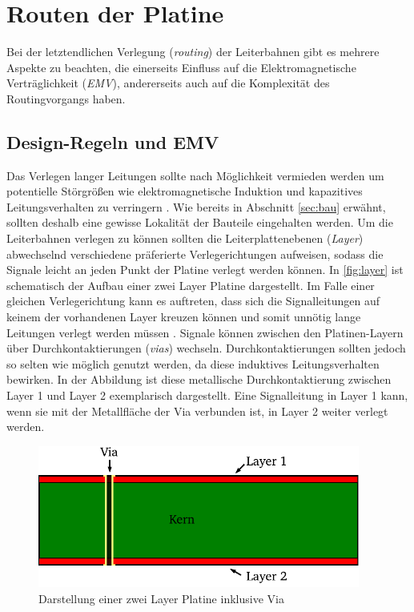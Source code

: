 \section{Routen der Platine}
Bei der letztendlichen Verlegung (\textit{routing}) der Leiterbahnen gibt es mehrere Aspekte zu beachten, die einerseits Einfluss auf die Elektromagnetische Verträglichkeit (\textit{EMV}), andererseits auch auf die Komplexität des Routingvorgangs haben.
\subsection{Design-Regeln und EMV}\label{sec:design}
Das Verlegen langer Leitungen sollte nach Möglichkeit vermieden werden um potentielle Störgrößen wie elektromagnetische Induktion und kapazitives Leitungsverhalten zu verringern \cite{haendschke}. Wie bereits in Abschnitt \autoref{sec:bau} erwähnt, sollten deshalb eine gewisse Lokalität der Bauteile eingehalten werden. Um die Leiterbahnen verlegen zu können sollten die Leiterplattenebenen (\textit{Layer}) abwechselnd verschiedene präferierte Verlegerichtungen aufweisen, sodass die Signale leicht an jeden Punkt der Platine verlegt werden können. In \autoref{fig:layer} ist schematisch der Aufbau einer zwei Layer Platine dargestellt. Im Falle einer gleichen Verlegerichtung kann es auftreten, dass sich die Signalleitungen auf keinem der vorhandenen Layer kreuzen können und somit unnötig lange Leitungen verlegt werden müssen \cite{haendschke}. Signale können zwischen den Platinen-Layern über Durchkontaktierungen (\textit{vias}) wechseln. Durchkontaktierungen sollten jedoch so selten wie möglich genutzt werden, da diese induktives Leitungsverhalten bewirken. In der Abbildung ist diese metallische Durchkontaktierung zwischen Layer 1 und Layer 2 exemplarisch dargestellt. Eine Signalleitung in Layer 1 kann, wenn sie mit der Metallfläche der Via verbunden ist, in Layer 2 weiter verlegt werden.
\begin{figure}[H]%
\centering
\includegraphics[width=300pt]{./Bilder/layer}%
\caption{Darstellung einer zwei Layer Platine inklusive Via}%
\label{fig:layer}%
\end{figure}\noindent
